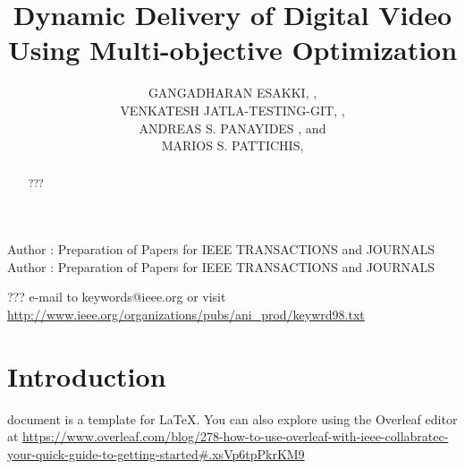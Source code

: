 \documentclass{ieeeaccess}
\begin{document}

\title{Dynamic Delivery of Digital Video Using Multi-objective Optimization}
\author{
\uppercase{Gangadharan Esakki},      , \\
\uppercase{Venkatesh Jatla-Testing-Git},          ,  \\
\uppercase{Andreas S. Panayides} , and \\
\uppercase{Marios S. Pattichis},     }
\address[1]{
Image and Video Processing and Communications Lab 
Department of Electrical and Computer Engineering 
The University of New Mexico
Albuquerque, New Mexico, NM 87131 USA
(e-mails: , pattichi)}
\address[2]{SiGiNT Solutions Ltd, 2311 Nicosia, Cyprus (e-mail: a.panayides@sigintsolutions.com)}
\address[3]{Department of Computer Science, University of Cyprus, 1678 Nicosia, Cyprus (e-mail: panayides@cs.ucy.ac.cy)}

\markboth
{Author \headeretal: Preparation of Papers for IEEE TRANSACTIONS and JOURNALS}
{Author \headeretal: Preparation of Papers for IEEE TRANSACTIONS and JOURNALS}


\begin{abstract}
???
\end{abstract}

\begin{keywords}
???
e-mail to keywords@ieee.org or visit \underline
{http://www.ieee.org/organizations/pubs/ani\_prod/keywrd98.txt}
\end{keywords}

\titlepgskip=-15pt

\maketitle

\section{Introduction}
\label{sec:introduction}
 document is a template for \LaTeX. 
You can also explore using the Overleaf editor at 
\underline
{https://www.overleaf.com/blog/278-how-to-use-overleaf-}\break\underline{with-ieee-collabratec-your-quick-guide-to-getting-started}\break\underline{\#.xsVp6tpPkrKM9}
\end{document}
